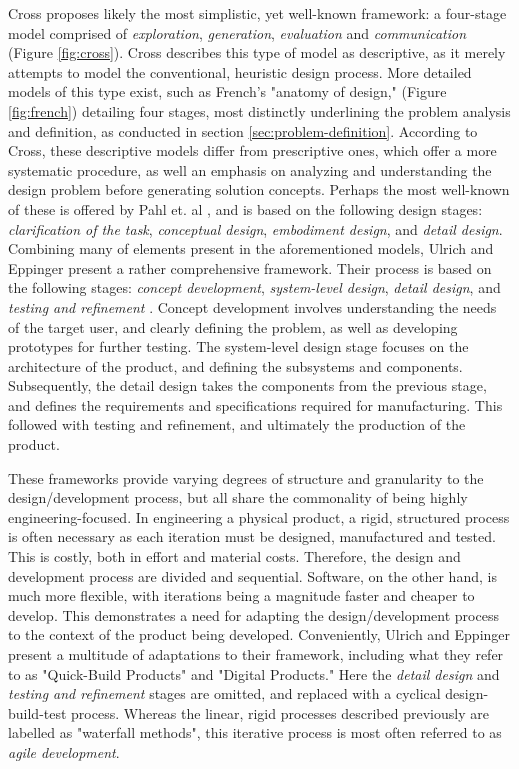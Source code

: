 Cross \cite{cross} proposes likely the most simplistic, yet well-known framework: a four-stage model comprised of \textit{exploration}, \textit{generation}, \textit{evaluation} and \textit{communication} (Figure \ref{fig:cross}). Cross describes this type of model as descriptive, as it merely attempts to model the conventional, heuristic design process. More detailed models of this type exist, such as French's \cite{french} "anatomy of design," (Figure \ref{fig:french}) detailing four stages, most distinctly underlining the problem analysis and definition, as conducted in section \ref{sec:problem-definition}. According to Cross, these descriptive models differ from prescriptive ones, which offer a more systematic procedure, as well an emphasis on analyzing and understanding the design problem before generating solution concepts. Perhaps the most well-known of these is offered by Pahl et. al \cite{pahl_beitz}, and is based on the following design stages: \textit{clarification of the task}, \textit{conceptual design}, \textit{embodiment design}, and \textit{detail design}. Combining many of elements present in the aforementioned models, Ulrich and Eppinger present a rather comprehensive framework. Their process is based on the following stages: \textit{concept development}, \textit{system-level design}, \textit{detail design}, and \textit{testing and refinement} \cite{ulrich_eppinger}. Concept development involves understanding the needs of the target user, and clearly defining the problem, as well as developing prototypes for further testing. The system-level design stage focuses on the architecture of the product, and defining the subsystems and components. Subsequently, the detail design takes the components from the previous stage, and defines the requirements and specifications required for manufacturing. This followed with testing and refinement, and ultimately the production of the product.

These frameworks provide varying degrees of structure and granularity to the design/development process, but all share the commonality of being highly engineering-focused. In engineering a physical product, a rigid, structured process is often necessary as each iteration must be designed, manufactured and tested. This is costly, both in effort and material costs. Therefore, the design and development process are divided and sequential. Software, on the other hand, is much more flexible, with iterations being a magnitude faster and cheaper to develop. This demonstrates a need for adapting the design/development process to the context of the product being developed. Conveniently, Ulrich and Eppinger present a multitude of adaptations to their framework, including what they refer to as "Quick-Build Products" and "Digital Products." Here the \textit{detail design} and \textit{testing and refinement} stages are omitted, and replaced with a cyclical design-build-test process. Whereas the linear, rigid processes described previously are labelled as "waterfall methods", this iterative process is most often referred to as \textit{agile development}.

